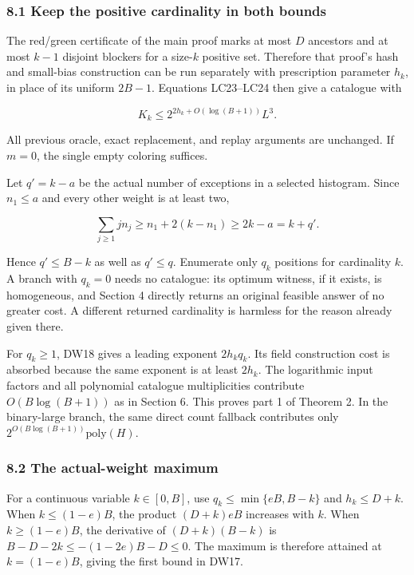 \hypertarget{af-fe230a140d-keep-the-positive-cardinality-in-both-bounds}{%
\subsubsection{8.1 Keep the positive cardinality in both bounds}\label{af-fe230a140d-keep-the-positive-cardinality-in-both-bounds}}

The red/green certificate of the main proof marks at most \(D\) ancestors and at most \(k-1\) disjoint blockers for a size-\(k\) positive set. Therefore that proof's hash and small-bias construction can be run separately with prescription parameter \(h_k\), in place of its uniform \(2B-1\). Equations LC23--LC24 then give a catalogue with

\[
K_k\le 2^{2h_k+O(\log(B+1))}L^3.
\tag{DW18}
\]

All previous oracle, exact replacement, and replay arguments are unchanged. If \(m=0\), the single empty coloring suffices.

Let \(q'=k-a\) be the actual number of exceptions in a selected histogram. Since \(n_1\le a\) and every other weight is at least two,

\[
\sum_{j\ge1}j n_j
\ge n_1+2(k-n_1)
\ge 2k-a=k+q'.
\tag{DW19}
\]

Hence \(q'\le B-k\) as well as \(q'\le q\). Enumerate only \(q_k\) positions for cardinality \(k\). A branch with \(q_k=0\) needs no catalogue: its optimum witness, if it exists, is homogeneous, and Section 4 directly returns an original feasible answer of no greater cost. A different returned cardinality is harmless for the reason already given there.

For \(q_k\ge1\), DW18 gives a leading exponent \(2h_k q_k\). Its field construction cost is absorbed because the same exponent is at least \(2h_k\). The logarithmic input factors and all polynomial catalogue multiplicities contribute \(O(B\log(B+1))\) as in Section 6. This proves part 1 of Theorem 2. In the binary-large branch, the same direct count fallback contributes only \(2^{O(B\log(B+1))}\mathrm{poly}(H)\).

\hypertarget{af-fe230a140d-the-actual-weight-maximum}{%
\subsubsection{8.2 The actual-weight maximum}\label{af-fe230a140d-the-actual-weight-maximum}}

For a continuous variable \(k\in[0,B]\), use \(q_k\le\min\{eB,B-k\}\) and \(h_k\le D+k\). When \(k\le(1-e)B\), the product \((D+k)eB\) increases with \(k\). When \(k\ge(1-e)B\), the derivative of \((D+k)(B-k)\) is \(B-D-2k\le-(1-2e)B-D\le0\). The maximum is therefore attained at \(k=(1-e)B\), giving the first bound in DW17.

